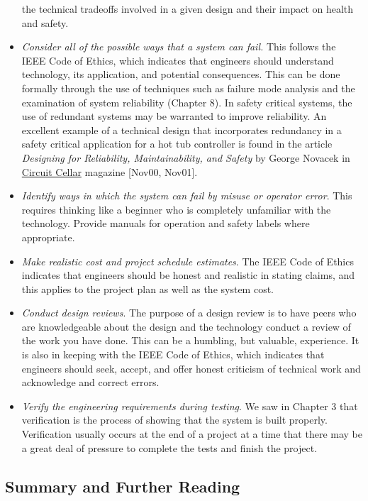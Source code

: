 \begin{itemize}
  the technical tradeoffs involved in a given design and their impact on
  health and safety.
\item
  \emph{Consider all of the possible ways that a system can fail.} This
  follows the IEEE Code of Ethics, which indicates that engineers should
  understand technology, its application, and potential consequences.
  This can be done formally through the use of techniques such as
  failure mode analysis and the examination of system reliability
  (Chapter 8). In safety critical systems, the use of redundant systems
  may be warranted to improve reliability. An excellent example of a
  technical design that incorporates redundancy in a safety critical
  application for a hot tub controller is found in the article
  \emph{Designing for Reliability, Maintainability, and Safety} by
  George Novacek in \ul{Circuit Cellar} magazine {[}Nov00, Nov01{]}.
\item
  \emph{Identify ways in which the system can fail by misuse or operator
  error}. This requires thinking like a beginner who is completely
  unfamiliar with the technology. Provide manuals for operation and
  safety labels where appropriate.
\item
  \emph{Make realistic cost and project schedule estimates}. The IEEE
  Code of Ethics indicates that engineers should be honest and realistic
  in stating claims, and this applies to the project plan as well as the
  system cost.
\item
  \emph{Conduct design reviews}. The purpose of a design review is to
  have peers who are knowledgeable about the design and the technology
  conduct a review of the work you have done. This can be a humbling,
  but valuable, experience. It is also in keeping with the IEEE Code of
  Ethics, which indicates that engineers should seek, accept, and offer
  honest criticism of technical work and acknowledge and correct errors.
\item
  \emph{Verify the engineering requirements during testing}. We saw in
  Chapter 3 that verification is the process of showing that the system
  is built properly. Verification usually occurs at the end of a project
  at a time that there may be a great deal of pressure to complete the
  tests and finish the project.
\end{itemize}

\subsection{Summary and Further
Reading}\label{summary-and-further-reading}


